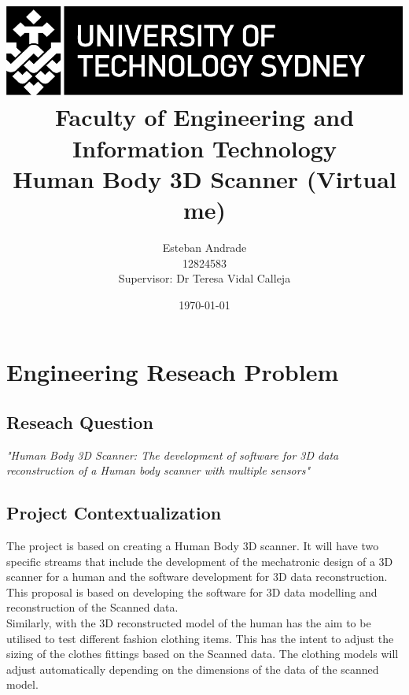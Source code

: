 \documentclass[12pt]{report}
\begin{document}
\begin{titlepage}

   

    \title{ \includegraphics[scale=1.7]{utslogo.jpg}\\[1cm]  
    Faculty of Engineering and Information Technology\\[1.0cm] 
    \Large{\textbf{Human Body 3D Scanner (Virtual me)}}\\}
    \author{Esteban Andrade\\ 
    12824583\\
    Supervisor: Dr Teresa Vidal Calleja\\}
    \date{\today}  
     \maketitle
     \cleardoublepage
\end{titlepage}

\tableofcontents
\thispagestyle{empty}
\newpage
\setcounter{page}{1}

\chapter{Engineering Reseach Problem}

\section{Reseach Question}
\textit{\large{"Human Body 3D Scanner: The development of software for 3D data reconstruction of a Human body scanner with multiple sensors" }}

\section{Project Contextualization}
The project is based on creating a Human Body 3D scanner.
It will have two specific streams that include the development of  the mechatronic design of a 3D scanner for a human and the software development for 3D data reconstruction. 
This proposal is based on developing the software for 3D data modelling and reconstruction of the Scanned data.\\[10pt]
Similarly, with the 3D reconstructed model of the human has the aim to be utilised to test different fashion clothing items. This has the intent to adjust the sizing of the clothes fittings based on the Scanned data. The clothing models will adjust automatically depending on the dimensions of the data of the scanned model. 
   
\end{document}
